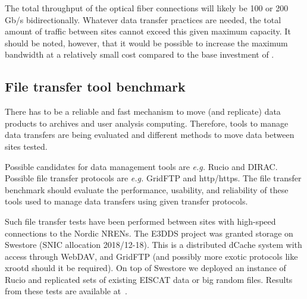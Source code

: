 \documentclass[12pt,a4paper]{article}
\begin{document}

The total throughput of the optical fiber connections will likely be 100 or 200 Gb/s bidirectionally. 
Whatever data transfer practices are needed, the total amount of traffic between \ED sites cannot exceed this given maximum capacity. It should be noted, however, that it would be possible to increase the maximum bandwidth at a relatively small cost compared to the base investment of \ED.

\subsection{File transfer tool benchmark}
There has to be a reliable and fast mechanism to move (and replicate) \ED data products to archives and user analysis computing. 
Therefore, tools to manage data transfers are being evaluated and different methods to move data between sites tested.

Possible candidates for data management tools are \emph{e.g.} Rucio and DIRAC. Possible file transfer protocols are \emph{e.g.} GridFTP and http/https.
The file transfer benchmark should evaluate the performance, usability, and reliability of these tools used to manage data transfers using given transfer protocols.


Such file transfer tests have been performed between sites with high-speed connections to the Nordic NRENs.  The E3DDS project was granted storage on Swestore (SNIC allocation 2018/12-18).  This is a distributed dCache system with access through WebDAV, and GridFTP (and possibly more exotic protocols like xrootd should it be required). 
On top of Swestore we deployed an instance of Rucio and replicated sets of existing EISCAT data or big random files. Results from these tests are available at~\cite{data-transfer-tests}.
\end{document}
